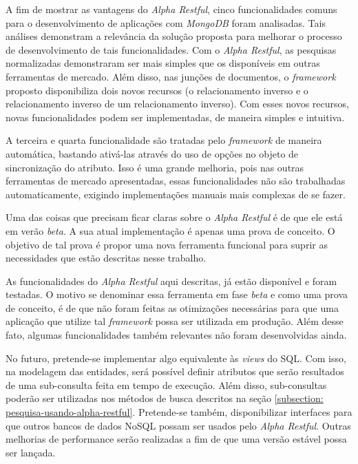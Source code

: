 A fim de mostrar as vantagens do \textit{Alpha Restful}, cinco funcionalidades comuns para o desenvolvimento de aplicações com \textit{MongoDB} foram analisadas. Tais análises demonstram a relevância da solução proposta para melhorar o processo de desenvolvimento de tais funcionalidades. Com o \textit{Alpha Restful}, as pesquisas normalizadas demonstraram ser mais simples que os disponíveis em outras ferramentas de mercado. Além disso, nas junções de documentos, o \textit{framework} proposto disponibiliza dois novos recursos (o relacionamento inverso e o relacionamento inverso de um relacionamento inverso). Com esses novos recursos, novas funcionalidades podem ser implementadas, de maneira simples e intuitiva.

A terceira e quarta funcionalidade são tratadas pelo \textit{framework} de maneira automática, bastando ativá-las através do uso de opções no objeto de sincronização do atributo. Isso é uma grande melhoria, pois nas outras ferramentas de mercado apresentadas, essas funcionalidades não são trabalhadas automaticamente, exigindo implementações manuais mais complexas de se fazer.

Uma das coisas que precisam ficar claras sobre o \textit{Alpha Restful} é de que ele está em verão \textit{beta}. A sua atual implementação é apenas uma prova de conceito. O objetivo de tal prova é propor uma nova ferramenta funcional para suprir as necessidades que estão descritas nesse trabalho.

As funcionalidades do \textit{Alpha Restful} aqui descritas, já estão disponível e foram testadas. O motivo se denominar essa ferramenta em fase \textit{beta} e como uma prova de conceito, é de que não foram feitas as otimizações necessárias para que uma aplicação que utilize tal \textit{framework} possa ser utilizada em produção. Além desse fato, algumas funcionalidades também relevantes não foram desenvolvidas ainda.

No futuro, pretende-se implementar algo equivalente às \textit{views} do SQL. Com isso, na modelagem das entidades, será possível definir atributos que serão resultados de uma sub-consulta feita em tempo de execução. Além disso, sub-consultas poderão ser utilizadas nos métodos de busca descritos na seção \ref{subsection: pesquisa-usando-alpha-restful}. Pretende-se também, disponibilizar interfaces para que outros bancos de dados NoSQL possam ser usados pelo \textit{Alpha Restful}. Outras melhorias de performance serão realizadas a fim de que uma versão estável possa ser lançada.

